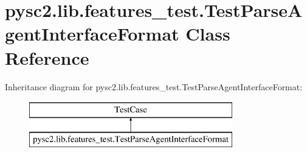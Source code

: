 \hypertarget{classpysc2_1_1lib_1_1features__test_1_1_test_parse_agent_interface_format}{}\section{pysc2.\+lib.\+features\+\_\+test.\+Test\+Parse\+Agent\+Interface\+Format Class Reference}
\label{classpysc2_1_1lib_1_1features__test_1_1_test_parse_agent_interface_format}
Inheritance diagram for pysc2.\+lib.\+features\+\_\+test.\+Test\+Parse\+Agent\+Interface\+Format\+:\begin{figure}[H]
\begin{center}
\leavevmode
\includegraphics[height=2.000000cm]{classpysc2_1_1lib_1_1features__test_1_1_test_parse_agent_interface_format}
\end{center}
\end{figure}

